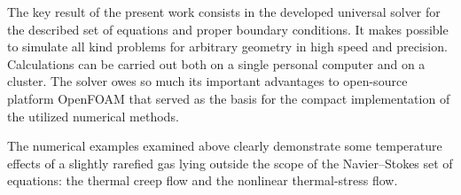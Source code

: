 \documentclass[smallextended, referee]{svjour3} %
\begin{document}
The key result of the present work consists in the developed universal solver for
the described set of equations and proper boundary conditions. It makes possible to
simulate all kind problems for arbitrary geometry in high speed and precision.
Calculations can be carried out both on a single personal computer and on a cluster.
The solver owes so much its important advantages to open-source platform OpenFOAM\textregistered{}
that served as the basis for the compact implementation of the utilized numerical methods.

The numerical examples examined above clearly demonstrate some temperature effects of
a slightly rarefied gas lying outside the scope of the Navier--Stokes set of equations:
the thermal creep flow and the nonlinear thermal-stress flow.


\end{document}
